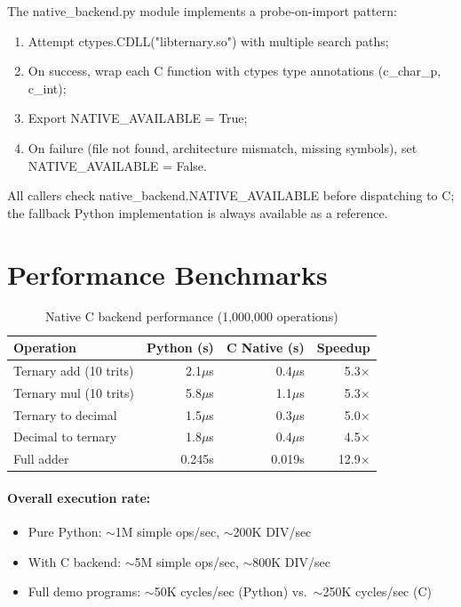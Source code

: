 \documentclass[12pt,a4paper,twoside]{book}
\theoremstyle{trinarytheorem}
\theoremstyle{trinarydefinition}
\newcommand{\code}[1]{\textsf{#1}}
\begin{document}
The \code{native\_backend.py} module implements a probe-on-import pattern:
\begin{enumerate}
    \item Attempt \code{ctypes.CDLL("libternary.so")} with multiple search paths;
    \item On success, wrap each C function with \code{ctypes} type annotations
          (\code{c\_char\_p}, \code{c\_int});
    \item Export \code{NATIVE\_AVAILABLE = True};
    \item On failure (file not found, architecture mismatch, missing symbols),
          set \code{NATIVE\_AVAILABLE = False}.
\end{enumerate}
All callers check \code{native\_backend.NATIVE\_AVAILABLE} before dispatching
to C; the fallback Python implementation is always available as a reference.

\section{Performance Benchmarks}

\begin{table}[H]
\centering
\caption{Native C backend performance (1,000,000 operations)}
\label{tab:nativeperf}
\begin{tabular}{lrrr}
\toprule
Operation & Python (s) & C Native (s) & Speedup \\
\midrule
Ternary add (10 trits) & 2.1$\mu$s & 0.4$\mu$s & 5.3$\times$ \\
Ternary mul (10 trits) & 5.8$\mu$s & 1.1$\mu$s & 5.3$\times$ \\
Ternary to decimal & 1.5$\mu$s & 0.3$\mu$s & 5.0$\times$ \\
Decimal to ternary & 1.8$\mu$s & 0.4$\mu$s & 4.5$\times$ \\
Full adder & 0.245s & 0.019s & 12.9$\times$ \\
\bottomrule
\end{tabular}
\end{table}

\paragraph{Overall execution rate:}
\begin{itemize}
    \item Pure Python: $\sim$1M simple ops/sec, $\sim$200K DIV/sec
    \item With C backend: $\sim$5M simple ops/sec, $\sim$800K DIV/sec
    \item Full demo programs: $\sim$50K cycles/sec (Python) vs.\ $\sim$250K cycles/sec (C)
\end{itemize}
\end{document}
